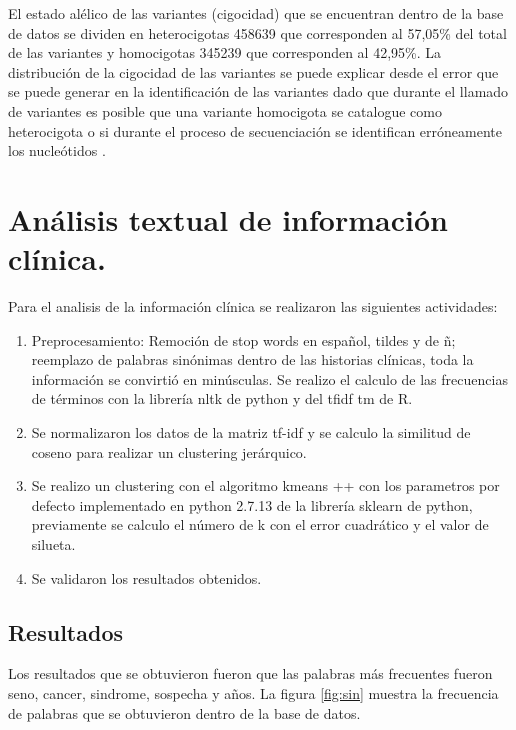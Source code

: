 El estado alélico de las variantes (cigocidad) que se encuentran dentro de la base de datos se dividen en heterocigotas 458639 que corresponden al 57,05\% del total de las variantes  y homocigotas 345239 que corresponden al 42,95\%. La distribución de la cigocidad de las variantes se puede explicar desde el error que se puede generar en la identificación de las variantes dado que durante el llamado  de variantes es posible que una variante homocigota se catalogue como heterocigota o si durante el proceso de secuenciación se identifican erróneamente los nucleótidos \cite{Babraham2016}\cite{Pirooznia2014}. 


\section{Análisis textual de información clínica.}

Para el analisis de la información clínica se realizaron las siguientes actividades:

\begin{enumerate}
	\item Preprocesamiento: Remoción de stop words en español, tildes y de ñ; reemplazo de palabras sinónimas dentro de las historias clínicas, toda la información se convirtió en minúsculas. Se realizo el calculo de las frecuencias de términos con la librería nltk de python y del tfidf tm de R.
	\item Se normalizaron los datos de la matriz tf-idf y se calculo la similitud de coseno para realizar un clustering jerárquico.
	\item  Se realizo un clustering con el algoritmo kmeans ++  con los parametros por defecto implementado en python 2.7.13 de la librería sklearn de python, previamente se calculo el número de k con el error cuadrático y el valor de silueta.
	\item Se validaron los resultados obtenidos. 
\end{enumerate} 
 
\subsection{Resultados}

Los resultados que se obtuvieron fueron que las palabras más frecuentes fueron seno, cancer, sindrome, sospecha y años. La figura \ref{fig:sin} muestra la frecuencia de palabras que se obtuvieron dentro de la base de datos.

